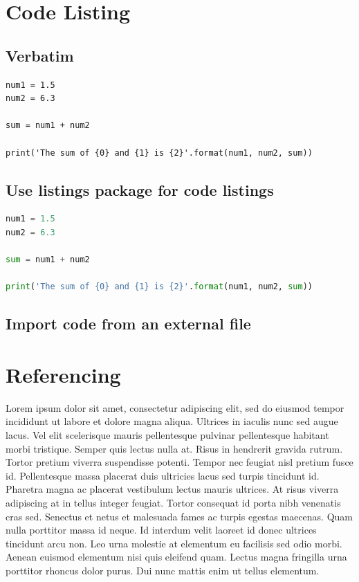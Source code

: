 \documentclass[a4paper, 12pt]{report}
\begin{document}
\chapter{Code Listing}
\section{Verbatim}
\begin{verbatim}
num1 = 1.5
num2 = 6.3

sum = num1 + num2

print('The sum of {0} and {1} is {2}'.format(num1, num2, sum))

\end{verbatim}

\section{Use listings package for code listings}
\begin{lstlisting}[language=Python]
num1 = 1.5
num2 = 6.3

sum = num1 + num2

print('The sum of {0} and {1} is {2}'.format(num1, num2, sum))

\end{lstlisting}

\section{Import code from an external file}





\chapter{Referencing}
Lorem ipsum dolor sit amet, consectetur adipiscing elit, sed do eiusmod tempor incididunt ut labore et dolore magna aliqua. Ultrices in iaculis nunc sed augue lacus. Vel elit scelerisque mauris pellentesque pulvinar pellentesque habitant morbi tristique. Semper quis lectus nulla at. Risus in hendrerit gravida rutrum. Tortor pretium viverra suspendisse potenti. Tempor nec feugiat nisl pretium fusce id. Pellentesque massa placerat duis ultricies lacus sed turpis tincidunt id. Pharetra magna ac placerat vestibulum lectus mauris ultrices. At risus viverra adipiscing at in tellus integer feugiat. Tortor consequat id porta nibh venenatis cras sed. Senectus et netus et malesuada fames ac turpis egestas maecenas. Quam nulla porttitor massa id neque. Id interdum velit laoreet id donec ultrices tincidunt arcu non. Leo urna molestie at elementum eu facilisis sed odio morbi. Aenean euismod elementum nisi quis eleifend quam. Lectus magna fringilla urna porttitor rhoncus dolor purus. Dui nunc mattis enim ut tellus elementum. \citep{4160265}
\end{document}
